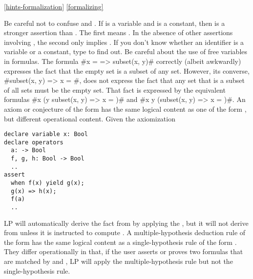 \ref{hints-formalization}
\ref{formalizing}

Be careful not to confuse  and
.  If  is a variable and  is a
constant, then  is a stronger assertion than .  The first
means .  In the absence of other assertions involving
, the second only implies .  If you don't know whether an
identifier is a variable or a constant, type
 to find out.
\p
Be careful about the use of free variables in formulas.  The formula
\fq#x = {} => subset(x, y)# correctly (albeit awkwardly) expresses the fact
that the empty set is a subset of any set.  However, its converse, 
\fq#subset(x, y) => x = {}#, does not express the fact that any set that is a
subset of all sets must be the empty set.  That fact is expressed by the
equivalent formulas \fq#\A x (\A y subset(x, y) => x = {})# and
\fq#\A x \E y (subset(x, y) => x = {})#.
\p
An axiom or conjecture of the form  has the same logical
content as one of the form , but different operational content.
Given the axiomization
\begin{verbatim}
declare variable x: Bool
declare operators
  a: -> Bool
  f, g, h: Bool -> Bool
  ..
assert 
  when f(x) yield g(x);
  g(x) => h(x);
  f(a)
  ..
\end{verbatim}
LP will automatically derive the fact  from  by applying the
, but it will not derive  from 
 unless it is instructed to compute .
\p
A multiple-hypothesis deduction rule of the form  has the
same logical content as a single-hypothesis rule of the form 
.  They differ operationally in that, if the user
asserts or proves two formulas that are matched by  and , LP
will apply the multiple-hypothesis rule but not the single-hypothesis rule.
